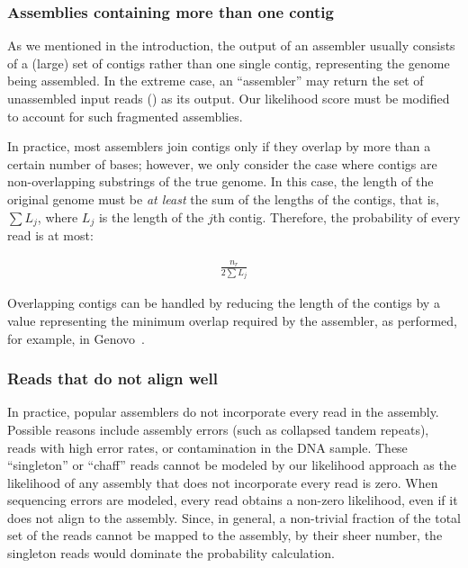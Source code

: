 \documentclass[12pt,\mydriver]{thesis}
\begin{document}
\subsubsection{Assemblies containing more than one contig}
As we mentioned in the introduction, the output of an assembler
usually consists of a (large) set of contigs rather than one single
contig, representing the genome being assembled.
In the extreme case, an ``assembler'' may return the set of
unassembled input reads () as its output.  Our likelihood score must be modified to account for such fragmented assemblies.

In practice, most assemblers join contigs only if they overlap by more than a certain number of bases; however, we only consider the case where contigs are non-overlapping substrings of the true genome.
In this case, the length of the original genome must be \emph{at least} the
sum of the lengths of the contigs, that is, $\sum L_j$, where $L_j$ is the
length of the $j$th contig. Therefore, the probability of every read
is at most:

\begin{equation}
\begin{aligned}
  \frac{n_r}{2\sum L_j}
\end{aligned}
\end{equation}

Overlapping contigs can be handled by reducing the length of the contigs by a value representing the minimum overlap required by the assembler, as performed, for example, in Genovo~\cite{genovo2011}.



\subsubsection{Reads that do not align well}
\label{methods_practical_unassembled}
In practice, popular assemblers do not incorporate every read in the
assembly.  Possible reasons include assembly errors (such as collapsed
tandem repeats), reads with high error rates, or contamination in the
DNA sample. These ``singleton'' or ``chaff'' reads cannot be modeled
by our likelihood approach as the likelihood of any assembly that
does not incorporate every read is zero.
When sequencing errors are modeled, every read obtains a non-zero likelihood, even if it does not align to the assembly. Since, in general, a non-trivial fraction of the total set of the reads cannot be mapped to the assembly, by their sheer number, the singleton reads would dominate the probability calculation.
\end{document}
